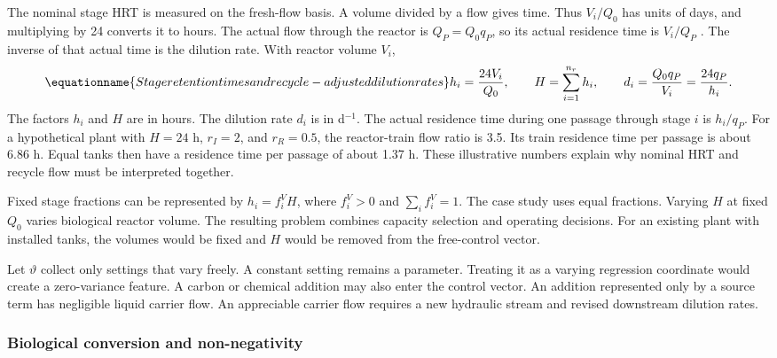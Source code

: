 The nominal stage HRT is measured on the fresh-flow basis. A volume divided by a flow gives time. Thus $V_i/Q_0$ has units of days, and multiplying by 24 converts it to hours. The actual flow through the reactor is $Q_P=Q_0q_P$, so its actual residence time is $V_i/Q_P$ \citep{Henze2008,Alex2008}. The inverse of that actual time is the dilution rate. With reactor volume $V_i$,
\begin{equation}
\equationname{Stage retention times and recycle-adjusted dilution rates}
h_i=\frac{24V_i}{Q_0},\qquad H=\sum_{i=1}^{n_r}h_i,\qquad
d_i=\frac{Q_0q_P}{V_i}=\frac{24q_P}{h_i}.
\label{eq:plant_residence}
\end{equation}
The factors $h_i$ and $H$ are in hours. The dilution rate $d_i$ is in d$^{-1}$. The actual residence time during one passage through stage $i$ is $h_i/q_P$. For a hypothetical plant with $H=24$ h, $r_I=2$, and $r_R=0.5$, the reactor-train flow ratio is 3.5. Its train residence time per passage is about 6.86 h. Equal tanks then have a residence time per passage of about 1.37 h. These illustrative numbers explain why nominal HRT and recycle flow must be interpreted together.

Fixed stage fractions can be represented by $h_i=f_i^V H$, where $f_i^V>0$ and $\sum_i f_i^V=1$. The case study uses equal fractions. Varying $H$ at fixed $Q_0$ varies biological reactor volume. The resulting problem combines capacity selection and operating decisions. For an existing plant with installed tanks, the volumes would be fixed and $H$ would be removed from the free-control vector.

Let $\vartheta$ collect only settings that vary freely. A constant setting remains a parameter. Treating it as a varying regression coordinate would create a zero-variance feature. A carbon or chemical addition may also enter the control vector. An addition represented only by a source term has negligible liquid carrier flow. An appreciable carrier flow requires a new hydraulic stream and revised downstream dilution rates.

\subsubsection{Biological conversion and non-negativity}

